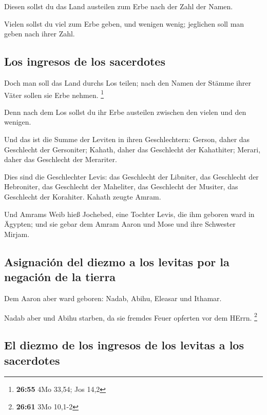  Diesen sollst du das Land austeilen zum Erbe nach der
Zahl der Namen.

 Vielen sollst du viel zum Erbe geben, und wenigen wenig;
jeglichen soll man geben nach ihrer Zahl.

\hypertarget{los-ingresos-de-los-sacerdotes}{%
\subsection{Los ingresos de los
sacerdotes}\label{los-ingresos-de-los-sacerdotes}}

 Doch man soll das Land durchs Los teilen; nach den Namen
der Stämme ihrer Väter sollen sie Erbe nehmen. \footnote{\textbf{26:55}
  4Mo 33,54; Jos 14,2}

 Denn nach dem Los sollst du ihr Erbe austeilen zwischen
den vielen und den wenigen.

 Und das ist die Summe der Leviten in ihren
Geschlechtern: Gerson, daher das Geschlecht der Gersoniter; Kahath,
daher das Geschlecht der Kahathiter; Merari, daher das Geschlecht der
Merariter.

 Dies sind die Geschlechter Levis: das Geschlecht der
Libniter, das Geschlecht der Hebroniter, das Geschlecht der Maheliter,
das Geschlecht der Musiter, das Geschlecht der Korahiter. Kahath zeugte
Amram.

 Und Amrams Weib hieß Jochebed, eine Tochter Levis, die
ihm geboren ward in Ägypten; und sie gebar dem Amram Aaron und Mose und
ihre Schwester Mirjam.

\hypertarget{asignaciuxf3n-del-diezmo-a-los-levitas-por-la-negaciuxf3n-de-la-tierra}{%
\subsection{Asignación del diezmo a los levitas por la negación de la
tierra}\label{asignaciuxf3n-del-diezmo-a-los-levitas-por-la-negaciuxf3n-de-la-tierra}}

 Dem Aaron aber ward geboren: Nadab, Abihu, Eleasar und
Ithamar.

 Nadab aber und Abihu starben, da sie fremdes Feuer
opferten vor dem HErrn. \footnote{\textbf{26:61} 3Mo 10,1-2}

\hypertarget{el-diezmo-de-los-ingresos-de-los-levitas-a-los-sacerdotes}{%
\subsection{El diezmo de los ingresos de los levitas a los
sacerdotes}\label{el-diezmo-de-los-ingresos-de-los-levitas-a-los-sacerdotes}}

